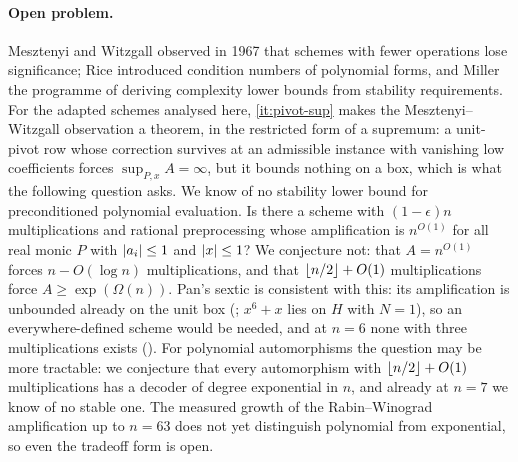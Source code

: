\paragraph{Open problem.}
Mesztenyi and Witzgall \cite{mesztenyi1967stable} observed in 1967 that
schemes with fewer operations lose significance; Rice
\cite{rice1965conditioning} introduced condition numbers of polynomial forms,
and Miller \cite{miller1975computational} the programme of deriving
complexity lower bounds from stability requirements.  For the adapted
schemes analysed here, \ref{it:pivot-sup}
makes the Mesztenyi--Witzgall observation a theorem, in the restricted form
of a supremum: a unit-pivot row whose correction survives at an admissible
instance with vanishing low coefficients forces $\sup_{P,x}A=\infty$, but it
bounds nothing on a box, which is what the following question asks.  We know of no stability lower bound
for preconditioned polynomial evaluation.  Is there a scheme with
$(1-\epsilon)n$ multiplications and rational preprocessing whose amplification
is $n^{O(1)}$ for all real monic $P$ with $\left\lvert a_i\right\rvert\le1$ and $\left\lvert x\right\rvert\le1$?
We conjecture not: that $A=n^{O(1)}$ forces $n-O(\log n)$ multiplications,
and that $\left\lfloor {n/2} \right\rfloor+O(1)$ multiplications force $A\ge\exp(\Omega(n))$.
Pan's sextic is consistent with this: its amplification is unbounded already
on the unit box (; $x^6+x$ lies on $H$ with
$N=1$), so an everywhere-defined scheme would be needed, and at $n=6$ none
with three multiplications exists ().
For polynomial automorphisms the question may be more tractable: we conjecture
that every automorphism with $\left\lfloor {n/2} \right\rfloor+O(1)$ multiplications has a decoder
of degree exponential in $n$, and already at $n=7$ we know of no stable one.
The measured growth of the Rabin--Winograd amplification up to $n=63$ does
not yet distinguish polynomial from exponential, so even the tradeoff form is
open.
